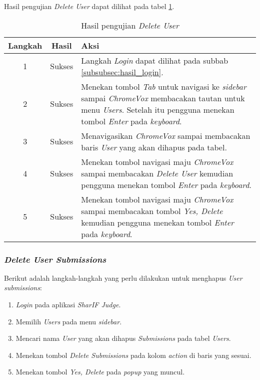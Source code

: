 Hasil pengujian \textit{Delete User} dapat dilihat pada tabel \ref{tab:hasil_delete_user}.

\begin{table}[H]
	\centering
	\caption{Hasil pengujian \textit{Delete User}}
	\label{tab:hasil_delete_user}
	\begin{tabular}{|c|c|p{12cm}|}
		\toprule
		Langkah & Hasil & Aksi\\
		\midrule
		1 & Sukses & Langkah \textit{Login} dapat dilihat pada subbab \ref{subsubsec:hasil_login}.\\
		2 & Sukses & Menekan tombol \textit{Tab} untuk navigasi ke \textit{sidebar} sampai \textit{ChromeVox} membacakan tautan untuk menu \textit{Users}. Setelah itu pengguna menekan tombol \textit{Enter} pada \textit{keyboard}.\\
		3 & Sukses & Menavigasikan \textit{ChromeVox} sampai membacakan baris \textit{User} yang akan dihapus pada tabel.\\
		4 & Sukses & Menekan tombol navigasi maju \textit{ChromeVox} sampai membacakan \textit{Delete User} kemudian pengguna menekan tombol \textit{Enter} pada \textit{keyboard}.\\
		5 & Sukses & Menekan tombol navigasi maju \textit{ChromeVox} sampai membacakan tombol \textit{Yes, Delete} kemudian pengguna menekan tombol \textit{Enter} pada \textit{keyboard}.\\
		\bottomrule
	\end{tabular}
\end{table}

\subsubsection{\textit{Delete User Submissions}}
\label{subsubsec:skenario_delete_user_submissions}
Berikut adalah langkah-langkah yang perlu dilakukan untuk menghapus \textit{User submissions}:

\begin{enumerate}
	\item \textit{Login} pada aplikasi \textit{SharIF Judge}.
	\item Memilih \textit{Users} pada menu \textit{sidebar}.
	\item Mencari nama \textit{User} yang akan dihapus \textit{Submissions} pada tabel \textit{Users}.
	\item Menekan tombol \textit{Delete Submissions} pada kolom \textit{action} di baris yang sesuai.
	\item Menekan tombol \textit{Yes, Delete} pada \textit{popup} yang muncul.
\end{enumerate}

